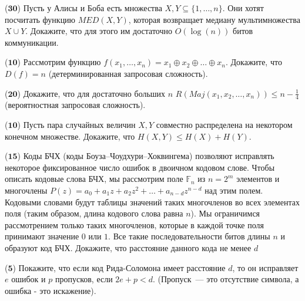 \begin{task} ($\mathbf{30}$)
    Пусть у Алисы и Боба есть множества $X, Y \subseteq \{1, \dots, n\}$. Они хотят
    посчитать функцию $MED(X, Y)$, которая возвращает медиану мультимножества $X \cup
    Y$. Докажите, что для этого им достаточно $O(\log(n))$ битов коммуникации.
\end{task}

\begin{task} ($\mathbf{10}$)
    Рассмотрим функцию $f(x_1, \dots, x_n) = x_1 \oplus x_2 \oplus \dots \oplus
    x_n$. Докажите, что $D(f) = n$ (детерминированная запросовая сложность).
\end{task}

\begin{task} ($\mathbf{20}$)
    Докажите, что для достаточно больших $n$ $R(Maj(x_1, x_2, \dots, x_n)) \le n -
    \frac{1}{4}$ (вероятностная запросовая сложность).
\end{task}


\begin{task} ($\mathbf{10}$)
	Пусть пара случайных величин $X, Y$  совместно распределена на некотором конечном
    множестве. Докажите, что $H(X, Y) \le H(X) + H(Y)$.
\end{task}


\begin{task} ($\mathbf{15}$)
    Коды БЧХ (коды Боуза–Чоудхури–Хоквингема) позволяют исправлять некоторое
    фиксированное число ошибок в двоичном кодовом слове. Чтобы описать кодовые слова
    БЧХ, мы рассмотрим поле $\mathbb{F}_n$ из $n = 2^m$ элементов и многочлены $P(z)
    = a_0 + a_1 z + a_2 z^2 + \dots + a_{n - d} z^{n - d}$ над этим полем. Кодовыми
    словами будут таблицы значений таких многочленов во всех элементах поля (таким
    образом, длина кодового слова равна $n$). Мы ограничимся рассмотрением только
    таких многочленов, которые в каждой точке поля принимают значение $0$ или
    $1$. Все такие последовательности битов длины $n$ и образуют код БЧХ.
    Докажите, что расстояние данного кода не менее $d$
\end{task}

\begin{task} ($\mathbf{5}$)
	Покажите, что если код Рида-Соломона имеет расстояние $d$, то он исправляет $e$
    ошибок и $p$ пропусков, если $2e + p < d$. (Пропуск~--- это отсутствие символа, а
    ошибка - это искажение).
\end{task}